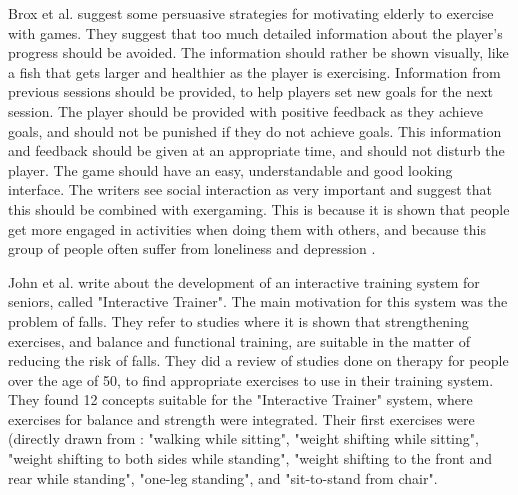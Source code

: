 Brox et al. \cite{exergamesforelderly} suggest some persuasive strategies for motivating elderly to exercise with games. They suggest that too much detailed information about the player's progress should be avoided. The information should rather be shown visually, like a fish that gets larger and healthier as the player is exercising. Information from previous sessions should be provided, to help players set new goals for the next session. The player should be provided with positive feedback as they achieve goals, and should not be punished if they do not achieve goals. This information and feedback should be given at an appropriate time, and should not disturb the player. The game should have an easy, understandable and good looking interface. The writers see social interaction as very important and suggest that this should be combined with exergaming. This is because it is shown that people get more engaged in activities when doing them with others, and because this group of people often suffer from loneliness and depression \cite{exergamesforelderly}. 

John et al. \cite{john2012smartsenior} write about the development of an interactive training system for seniors, called "Interactive Trainer". The main motivation for this system was the problem of falls. They refer to studies where it is shown that strengthening exercises, and balance and functional training, are suitable in the matter of reducing the risk of falls. They did a review of studies done on therapy for people over the age of 50, to find appropriate exercises to use in their training system. They found 12 concepts suitable for the "Interactive Trainer" system, where exercises for balance and strength were integrated. Their first exercises were (directly drawn from \cite{john2012smartsenior}: "walking while sitting", "weight shifting while sitting", "weight shifting to both sides while standing", "weight shifting to the front and rear while standing", "one-leg standing", and "sit-to-stand from chair".
      
